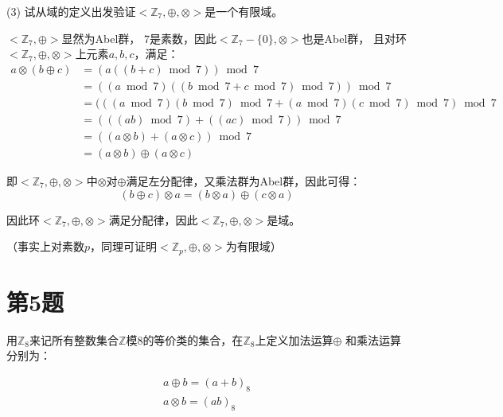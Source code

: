     

(3) 试从域的定义出发验证$<\mathbb{Z}_7, \oplus, \otimes>$是一个有限域。

\begin{Solution}
    $<\mathbb{Z}_7, \oplus>$显然为Abel群，
    $7$是素数，因此$<\mathbb{Z}_7-\{0\}, \otimes>$也是Abel群，
    且对环$<\mathbb{Z}_7, \oplus, \otimes>$上元素$a,b,c$，满足：
    \begin{equation}
        \begin{aligned}
            a\otimes (b\oplus c)    & = (a ((b + c) \bmod 7)) \bmod 7 \\
                                    & = ((a \bmod 7)  ((b \bmod 7 + c \bmod 7) \bmod 7)) \bmod 7 \\
                                    & = (((a \bmod 7)(b \bmod 7) \bmod 7 + (a \bmod 7)(c \bmod 7) \bmod 7) \bmod 7 \\
                                    & = (((ab) \bmod 7)+((ac) \bmod 7)) \bmod 7\\
                                    & = ((a \otimes b) + (a \otimes c)) \bmod 7\\
                                    & = (a\otimes b) \oplus (a\otimes c)
        \end{aligned}
    \end{equation}

    即$<\mathbb{Z}_7, \oplus, \otimes>$中$\otimes$对$\oplus$满足左分配律，又乘法群为Abel群，因此可得：
    \begin{equation}
        (b\oplus c) \otimes a =  (b\otimes a) \oplus (c\otimes a)
    \end{equation}

    因此环$<\mathbb{Z}_7, \oplus, \otimes>$满足分配律，因此$<\mathbb{Z}_7, \oplus, \otimes>$是域。

    （事实上对素数$p$，同理可证明$<\mathbb{Z}_p, \oplus, \otimes>$为有限域）
\end{Solution}

\section{第5题}

用$\mathbb{Z}_8$来记所有整数集合$\mathbb{Z}$模$8$的等价类的集合，在$\mathbb{Z}_8$上定义加法运算$\oplus$
和乘法运算分别为：

\begin{equation}
    \begin{aligned}
        a \oplus b= (a+b)_8\\
        a \otimes b = (ab)_8\\
    \end{aligned}
\end{equation}

